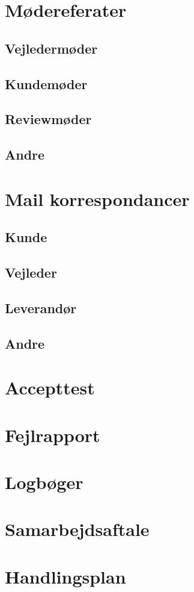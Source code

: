 \section{Mødereferater}
\label{mode}

\subsection{Vejledermøder}
\label{modevejleder}

\subsection{Kundemøder}
\label{modekunde}

\subsection{Reviewmøder}
\label{moderefreview}

\subsection{Andre}
\label{moderefAndre}

\section{Mail korrespondancer}
\label{mails}

\subsection{Kunde}
\label{mailKunde}

\subsection{Vejleder}
\label{mailvejleder}

\subsection{Leverandør}
\label{mailleverandor}

\subsection{Andre}
\label{mailAndre}

\section{Accepttest}
\label{bilag:Accepttest}

\section{Fejlrapport}
\label{bilag:Fejlrapport}

\section{Logbøger}
\label{bilag:Logboger}

\section{Samarbejdsaftale}
\label{bilag:samarbejdsaftale}

\section{Handlingsplan}
\label{bilag:Handlingsplan}